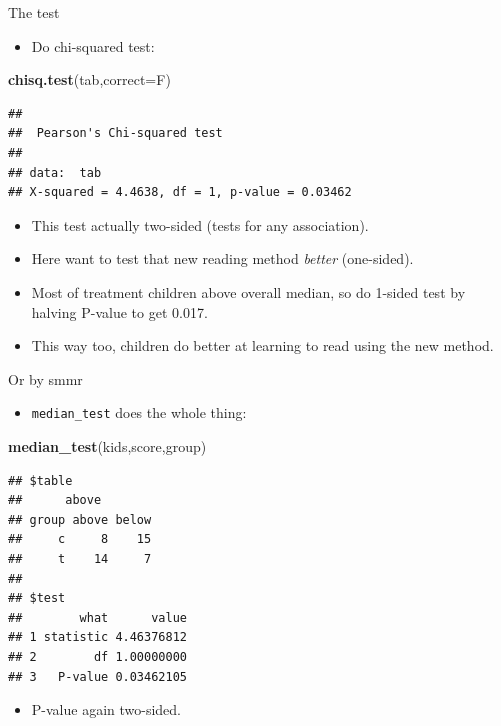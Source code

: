 \documentclass[
  ignorenonframetext,
]{beamer}
\newenvironment{Shaded}{\begin{snugshade}}{\end{snugshade}}
\newcommand{\DataTypeTok}[1]{\textcolor[rgb]{0.13,0.29,0.53}{#1}}
\newcommand{\KeywordTok}[1]{\textcolor[rgb]{0.13,0.29,0.53}{\textbf{#1}}}
\newcommand{\NormalTok}[1]{#1}
\providecommand{\tightlist}{%
  \setlength{\itemsep}{0pt}\setlength{\parskip}{0pt}}
\begin{document}
\begin{frame}[fragile]{The test}
\protect\hypertarget{the-test}{}

\begin{itemize}
\tightlist
\item
  Do chi-squared test:
\end{itemize}

\begin{Shaded}
\begin{Highlighting}[]
\KeywordTok{chisq.test}\NormalTok{(tab,}\DataTypeTok{correct=}\NormalTok{F)}
\end{Highlighting}
\end{Shaded}

\begin{verbatim}
## 
##  Pearson's Chi-squared test
## 
## data:  tab
## X-squared = 4.4638, df = 1, p-value = 0.03462
\end{verbatim}

\begin{itemize}
\tightlist
\item
  This test actually two-sided (tests for any association).
\item
  Here want to test that new reading method \emph{better} (one-sided).
\item
  Most of treatment children above overall median, so do 1-sided test by
  halving P-value to get 0.017.
\item
  This way too, children do better at learning to read using the new
  method.
\end{itemize}

\end{frame}

\begin{frame}[fragile]{Or by smmr}
\protect\hypertarget{or-by-smmr}{}

\begin{itemize}
\tightlist
\item
  \texttt{median\_test} does the whole thing:
\end{itemize}

\begin{Shaded}
\begin{Highlighting}[]
\KeywordTok{median_test}\NormalTok{(kids,score,group)}
\end{Highlighting}
\end{Shaded}

\begin{verbatim}
## $table
##      above
## group above below
##     c     8    15
##     t    14     7
## 
## $test
##        what      value
## 1 statistic 4.46376812
## 2        df 1.00000000
## 3   P-value 0.03462105
\end{verbatim}

\begin{itemize}
\tightlist
\item
  P-value again two-sided.
\end{itemize}

\end{frame}
\end{document}
